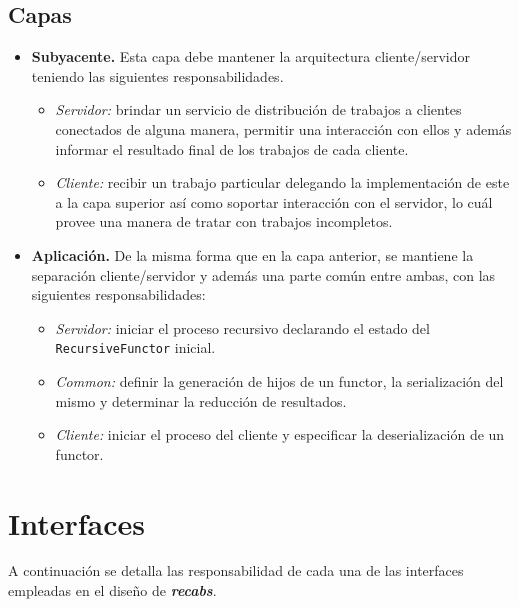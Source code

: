 \documentclass[a4paper,12pt,twoside]{article}
\def\ra {\textbf{\textit{recabs}}}
\begin{document}
        \subsection{Capas}
            \begin{itemize}
                
               \item \textbf{Subyacente.} Esta capa debe mantener la arquitectura cliente/servidor teniendo las siguientes responsabilidades.
                \begin{itemize}
                    \item \textit{Servidor:} brindar un servicio de distribución de trabajos a clientes conectados de alguna manera, permitir
                        una interacción con ellos y además informar el resultado final de los trabajos de cada cliente.
                    \item \textit{Cliente:} recibir un trabajo particular delegando la implementación de este a la capa superior así como 
                        soportar interacción con el servidor, lo cuál provee una manera de tratar con trabajos incompletos.
                \end{itemize}
               
                \item \textbf{Aplicación.} De la misma forma que en la capa anterior, se mantiene la separación cliente/servidor y además una
                    parte común entre ambas, con las siguientes responsabilidades:
    
                \begin{itemize}
                    \item \textit{Servidor:} iniciar el proceso recursivo declarando el estado del \texttt{RecursiveFunctor} inicial.
                    \item \textit{Common:} definir la generación de hijos de un functor, la serialización del mismo y determinar 
                        la reducción de resultados.
                    \item \textit{Cliente:} iniciar el proceso del cliente y especificar la deserialización de un functor.
                \end{itemize}
            
            \end{itemize}

    \section{Interfaces}
    A continuación se detalla las responsabilidad de cada una de las interfaces empleadas en el diseño de \ra. 
    
\end{document}
